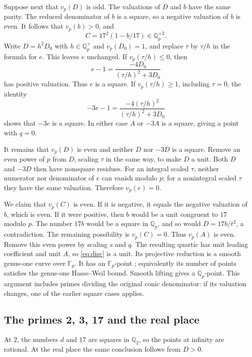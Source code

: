 \documentclass[11pt,a4paper]{article}
\theoremstyle{definition}\newtheorem{definition}[theorem]{Definition}
\newcommand{\Q}{\mathbb Q}\newcommand{\F}{\mathbb F}
\begin{document}
Suppose next that $v_p(D)$ is odd. The valuations of $D$ and $b$ have
the same parity. The reduced denominator of $b$ is a square, so a negative
valuation of $b$ is even. It follows that $v_p(b)>0$, and
\[
                      C=17^2(1-b/17)\in\Q_p^{\times2}.
\]
Write $D=h^2D_0$ with $h\in\Q_p^\times$ and $v_p(D_0)=1$, and
replace $\tau$ by $\tau/h$ in the formula for $e$. This leaves $e$
unchanged. If $v_p(\tau/h)\le0$, then
\begin{equation}\label{eq:units}
 e-1=\frac{-4D_0}{(\tau/h)^2+3D_0}
\end{equation}
has positive valuation. Thus $e$ is a square. If $v_p(\tau/h)\ge1$,
including $\tau=0$, the identity
\[
 -3e-1=\frac{-4(\tau/h)^2}{(\tau/h)^2+3D_0}
\]
shows that $-3e$ is a square. In either case $A$ or $-3A$ is a square,
giving a point with $q=0$.

It remains that $v_p(D)$ is even and neither $D$ nor $-3D$ is a
square. Remove an even power of $p$ from $D$, scaling $\tau$ in the
same way, to make $D$ a unit. Both $D$ and $-3D$ then have nonsquare
residues. For an integral scaled $\tau$, neither numerator nor denominator
of $e$ can vanish modulo $p$; for a nonintegral scaled $\tau$ they have
the same valuation. Therefore $v_p(e)=0$.

We claim that $v_p(C)$ is even. If it is negative, it equals the negative
valuation of $b$, which is even. If it were positive, then $b$ would be a
unit congruent to $17$ modulo $p$. The number $17b$ would be a square in
$\Q_p$, and so would $D=17b/t^2$, a contradiction. The remaining
possibility is $v_p(C)=0$. Thus $v_p(A)$ is even. Remove this even power
by scaling $s$ and $q$. The resulting quartic has unit leading coefficient
and unit $A$, so \eqref{eq:disc} is a unit. Its projective reduction is a
smooth genus-one curve over $\F_p$. It has an $\F_p$-point
\cite[Chapter~IV, Corollary~9.3]{Milne}; equivalently its number of points
satisfies the genus-one Hasse--Weil bound. Smooth lifting gives a
$\Q_p$-point. This argument includes primes dividing the original conic
denominator: if its valuation changes, one of the earlier square cases
applies.

\subsection{The primes 2, 3, 17 and the real place}

At $2$, the numbers $d$ and $17$ are squares in $\Q_2$, so the points
at infinity are rational. At the real place the same conclusion follows
from $D>0$.
\end{document}

